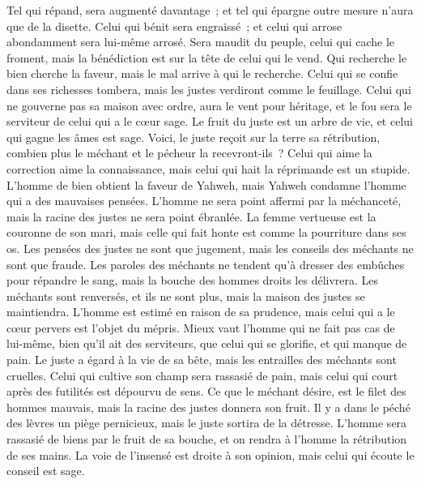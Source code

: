 \begin{multicols}{2}
Tel qui répand, sera augmenté davantage~; et tel qui épargne outre mesure n'aura que de la disette.
Celui qui bénit sera engraissé~; et celui qui arrose abondamment sera lui-même arrosé.
Sera maudit du peuple, celui qui cache le froment, mais la bénédiction est sur la tête de celui qui le vend.
Qui recherche le bien cherche la faveur, mais le mal arrive à qui le recherche.
Celui qui se confie dans ses richesses tombera, mais les justes verdiront comme le feuillage.
Celui qui ne gouverne pas sa maison avec ordre, aura le vent pour héritage, et le fou sera le serviteur de celui qui a le cœur sage.
Le fruit du juste est un arbre de vie, et celui qui gagne les âmes est sage.
Voici, le juste reçoit sur la terre sa rétribution, combien plus le méchant et le pécheur la recevront-ils~?
\VerseOne{}Celui qui aime la correction aime la connaissance, mais celui qui hait la réprimande est un stupide.
L'homme de bien obtient la faveur de Yahweh, mais Yahweh condamne l'homme qui a des mauvaises pensées.
L'homme ne sera point affermi par la méchanceté, mais la racine des justes ne sera point ébranlée.
La femme vertueuse est la couronne de son mari, mais celle qui fait honte est comme la pourriture dans ses os.
Les pensées des justes ne sont que jugement, mais les conseils des méchants ne sont que fraude.
Les paroles des méchants ne tendent qu'à dresser des embûches pour répandre le sang, mais la bouche des hommes droits les délivrera.
Les méchants sont renversés, et ils ne sont plus, mais la maison des justes se maintiendra.
L'homme est estimé en raison de sa prudence, mais celui qui a le cœur pervers est l'objet du mépris.
Mieux vaut l'homme qui ne fait pas cas de lui-même, bien qu'il ait des serviteurs, que celui qui se glorifie, et qui manque de pain.
Le juste a égard à la vie de sa bête, mais les entrailles des méchants sont cruelles.
Celui qui cultive son champ sera rassasié de pain, mais celui qui court après des futilités est dépourvu de sens.
Ce que le méchant désire, est le filet des hommes mauvais, mais la racine des justes donnera son fruit.
Il y a dans le péché des lèvres un piège pernicieux, mais le juste sortira de la détresse.
L'homme sera rassasié de biens par le fruit de sa bouche, et on rendra à l'homme la rétribution de ses mains.
La voie de l'insensé est droite à son opinion, mais celui qui écoute le conseil est sage.

\end{multicols}
